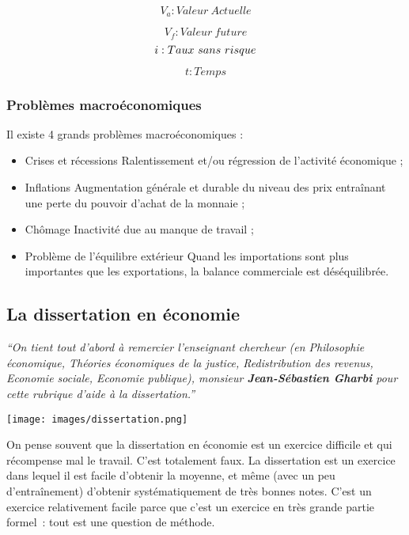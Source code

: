 \documentclass[
  letterpaper,
  DIV=11,
  numbers=noendperiod]{scrartcl}
\begin{document}
\[
V_a : Valeur\ Actuelle
\]

\[
V_f : Valeur\ future
\] \[
i : Taux\ sans\ risque\\ 
\]

\[
t : Temps
\]

\subsubsection{Problèmes
macroéconomiques}\label{probluxe8mes-macrouxe9conomiques}

Il existe 4 grands problèmes macroéconomiques :

\begin{itemize}
\item
  Crises et récessions Ralentissement et/ou régression de l'activité
  économique ;
\item
  Inflations Augmentation générale et durable du niveau des prix
  entraînant une perte du pouvoir d'achat de la monnaie ;
\item
  Chômage Inactivité due au manque de travail ;
\item
  Problème de l'équilibre extérieur Quand les importations sont plus
  importantes que les exportations, la balance commerciale est
  déséquilibrée.
\end{itemize}

\subsection{La dissertation en
économie}\label{la-dissertation-en-uxe9conomie}

\emph{``On tient tout d'abord à remercier l'enseignant chercheur (en
Philosophie économique, Théories économiques de la justice,
Redistribution des revenus, Economie sociale, Economie publique),
monsieur \textbf{Jean-Sébastien Gharbi} pour cette rubrique d'aide à la
dissertation.''}

\begin{center}
\texttt{[image: images/dissertation.png]}
\end{center}

On pense souvent que la dissertation en économie est un exercice
difficile et qui récompense mal le travail. C'est totalement faux. La
dissertation est un exercice dans lequel il est facile d'obtenir la
moyenne, et même (avec un peu d'entraînement) d'obtenir systématiquement
de très bonnes notes. C'est un exercice relativement facile parce que
c'est un exercice en très grande partie formel~: tout est une question
de méthode.
\end{document}
